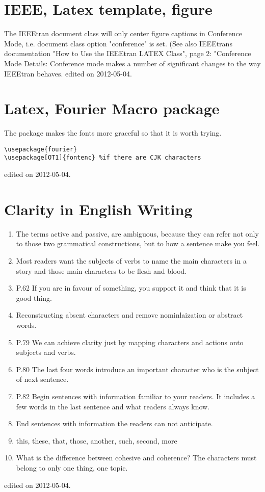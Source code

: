 \section{IEEE, Latex template, figure}
The IEEEtran document class will only center figure captions in Conference Mode, i.e. document class option "conference" is set.
(See also IEEEtrans documentation "How to Use the IEEEtran LATEX Class", page 2: "Conference Mode Details: Conference mode makes a number of significant changes to the way IEEEtran behaves.
\hfill{\tiny edited on 2012-05-04.}

\section{Latex, Fourier Macro package}
The package makes the fonts more graceful so that it is worth trying.
\begin{verbatim}
\usepackage{fourier}
\usepackage[OT1]{fontenc} %if there are CJK characters
\end{verbatim}
\hfill{\tiny edited on 2012-05-04.}
\section{Clarity in English Writing}
\begin{enumerate}
\item The terms active and passive, are ambiguous, because they can refer not only to those two grammatical constructions,
but to how a sentence make you feel.
\item Most readers want the subjects of verbs to name the main characters in a story 
and those main characters to be flesh and blood.
\item P.62 If you are in favour of something, you support it and think that it is good thing.
\item Reconstructing absent characters and remove nominlaization or abstract words.
\item P.79 We can achieve clarity just by mapping characters and actions onto subjects and verbs.
\item P.80 The last four words introduce an important character who is the subject of next sentence.
\item P.82 Begin sentences with information familiar to your readers. It includes a few words in the last sentence and what readers always know.
\item End sentences with information the readers can not anticipate. 
\item this, these, that, those, another, such, second, more
\item What is the difference between cohesive and coherence? The characters must belong to only one thing, one topic.
\end{enumerate}
\hfill {\tiny  edited on 2012-05-04.}
